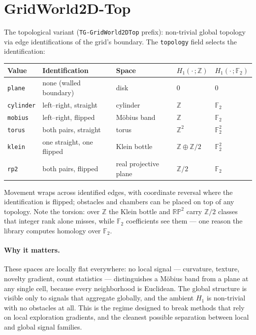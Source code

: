 \documentclass[11pt]{article}
\newcommand{\Hm}[1]{H_{#1}}
\newcommand{\F}{\mathbb{F}}
\newcommand{\Z}{\mathbb{Z}}
\begin{document}
\section{GridWorld2D-Top}
\label{sec:top}

The topological variant (\texttt{TG-GridWorld2DTop} prefix):
non-trivial global topology via edge identifications of the grid's
boundary. The \texttt{topology} field selects the identification:
\begin{center}
\small
\begin{tabular}{@{}lllll@{}}
\toprule
\textbf{Value} & \textbf{Identification} & \textbf{Space} &
\textbf{$\Hm{1}(\cdot\,; \Z)$} & \textbf{$\Hm{1}(\cdot\,; \F_2)$} \\
\midrule
\texttt{plane} & none (walled boundary) & disk & $0$ & $0$ \\
\texttt{cylinder} & left--right, straight & cylinder & $\Z$ & $\F_2$ \\
\texttt{mobius} & left--right, flipped & M\"obius band & $\Z$ & $\F_2$ \\
\texttt{torus} & both pairs, straight & torus & $\Z^2$ & $\F_2^2$ \\
\texttt{klein} & one straight, one flipped & Klein bottle &
  $\Z \oplus \Z/2$ & $\F_2^2$ \\
\texttt{rp2} & both pairs, flipped & real projective plane &
  $\Z/2$ & $\F_2$ \\
\bottomrule
\end{tabular}
\end{center}
Movement wraps across identified edges, with coordinate reversal
where the identification is flipped; obstacles and chambers can be
placed on top of any topology. Note the torsion: over $\Z$ the Klein
bottle and $\mathbb{RP}^2$ carry $\Z/2$ classes that integer rank
alone misses, while $\F_2$ coefficients see them --- one reason the
library computes homology over $\F_2$.

\paragraph{Why it matters.} These spaces are locally flat everywhere:
no local signal --- curvature, texture, novelty gradient, count
statistics --- distinguishes a M\"obius band from a plane at any
single cell, because every neighborhood is Euclidean. The global
structure is visible only to signals that aggregate globally, and the
ambient $\Hm{1}$ is non-trivial with no obstacles at all. This is the
regime designed to break methods that rely on local exploration
gradients, and the cleanest possible separation between local and
global signal families.
\end{document}
